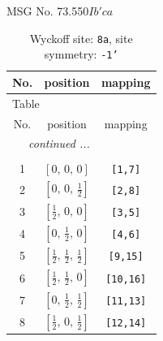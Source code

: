 \documentclass[fleqn,8pt]{jsarticle}
\begin{document}
\setcounter{MaxMatrixCols}{32}

\renewcommand{\tablename}{Table~}
\renewcommand{\figurename}{Figure~}
\begin{center}
\LARGE
MSG No. 73.550\quad$Ib'ca$
\end{center}
\renewcommand{\arraystretch}{1.2}
\begin{longtable}{ccc}
\caption{Wyckoff site: {\tt 8a}, site symmetry: {\tt -1'}}
 \\
 \hline \hline
No. & position & mapping \\ \hline \endfirsthead

\multicolumn{2}{l}{\tablename\ \thetable{}} \\
 \hline \hline
No. & position & mapping \\ \hline \endhead

 \hline \hline
\multicolumn{2}{r}{\footnotesize\it continued ...} \\ \endfoot

 \hline \hline
\multicolumn{2}{r}{} \\ \endlastfoot

1 & $\left[ 0,\, 0,\, 0 \right]$ & {\tt [1,7]} \\ \hline
2 & $\left[ 0,\, 0,\, \frac{1}{2} \right]$ & {\tt [2,8]} \\ \hline
3 & $\left[ \frac{1}{2},\, 0,\, 0 \right]$ & {\tt [3,5]} \\ \hline
4 & $\left[ 0,\, \frac{1}{2},\, 0 \right]$ & {\tt [4,6]} \\ \hline
5 & $\left[ \frac{1}{2},\, \frac{1}{2},\, \frac{1}{2} \right]$ & {\tt [9,15]} \\ \hline
6 & $\left[ \frac{1}{2},\, \frac{1}{2},\, 0 \right]$ & {\tt [10,16]} \\ \hline
7 & $\left[ 0,\, \frac{1}{2},\, \frac{1}{2} \right]$ & {\tt [11,13]} \\ \hline
8 & $\left[ \frac{1}{2},\, 0,\, \frac{1}{2} \right]$ & {\tt [12,14]} \\
\end{longtable}
\renewcommand{\arraystretch}{1.2}
\end{document}
